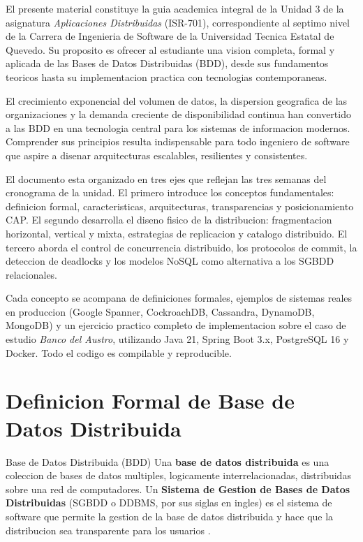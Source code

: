 \documentclass[11pt,a4paper]{article}
\begin{document}
El presente material constituye la guia academica integral de la Unidad 3 de la asignatura \textit{Aplicaciones Distribuidas} (ISR-701), correspondiente al septimo nivel de la Carrera de Ingenieria de Software de la Universidad Tecnica Estatal de Quevedo. Su proposito es ofrecer al estudiante una vision completa, formal y aplicada de las Bases de Datos Distribuidas (BDD), desde sus fundamentos teoricos hasta su implementacion practica con tecnologias contemporaneas.

El crecimiento exponencial del volumen de datos, la dispersion geografica de las organizaciones y la demanda creciente de disponibilidad continua han convertido a las BDD en una tecnologia central para los sistemas de informacion modernos. Comprender sus principios resulta indispensable para todo ingeniero de software que aspire a disenar arquitecturas escalables, resilientes y consistentes.

El documento esta organizado en tres ejes que reflejan las tres semanas del cronograma de la unidad. El primero introduce los conceptos fundamentales: definicion formal, caracteristicas, arquitecturas, transparencias y posicionamiento CAP. El segundo desarrolla el diseno fisico de la distribucion: fragmentacion horizontal, vertical y mixta, estrategias de replicacion y catalogo distribuido. El tercero aborda el control de concurrencia distribuido, los protocolos de commit, la deteccion de deadlocks y los modelos NoSQL como alternativa a los SGBDD relacionales.

Cada concepto se acompana de definiciones formales, ejemplos de sistemas reales en produccion (Google Spanner, CockroachDB, Cassandra, DynamoDB, MongoDB) y un ejercicio practico completo de implementacion sobre el caso de estudio \textit{Banco del Austro}, utilizando Java 21, Spring Boot 3.x, PostgreSQL 16 y Docker. Todo el codigo es compilable y reproducible.

\section{Definicion Formal de Base de Datos Distribuida}

\begin{defbox}{Base de Datos Distribuida (BDD)}
Una \textbf{base de datos distribuida} es una coleccion de bases de datos multiples, logicamente interrelacionadas, distribuidas sobre una red de computadores. Un \textbf{Sistema de Gestion de Bases de Datos Distribuidas} (SGBDD o DDBMS, por sus siglas en ingles) es el sistema de software que permite la gestion de la base de datos distribuida y hace que la distribucion sea transparente para los usuarios \cite{ozsu2020}.
\end{defbox}
\end{document}
